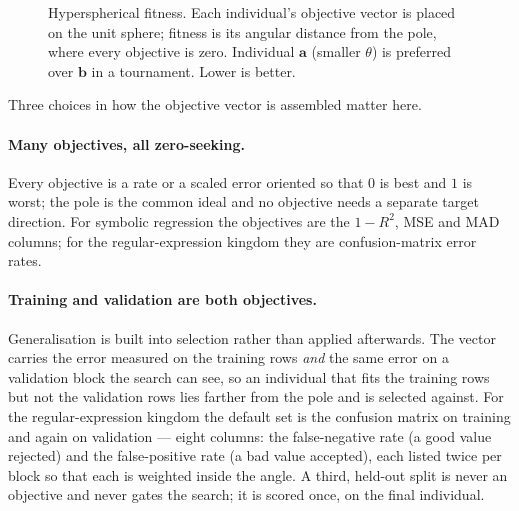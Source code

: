 \documentclass[sigconf,nonacm]{acmart}
\begin{document}
\begin{figure}[t]
\centering
{}
\caption{Hyperspherical fitness. Each individual's objective vector is placed on
the unit sphere; fitness is its angular distance from the pole, where every
objective is zero. Individual $\mathbf{a}$ (smaller $\theta$) is preferred over
$\mathbf{b}$ in a tournament. Lower is better.}
\label{fig:hff}
\end{figure}

Three choices in how the objective vector is assembled matter here.

\paragraph{Many objectives, all zero-seeking.} Every objective is a rate or a
scaled error oriented so that $0$ is best and $1$ is worst; the pole is the
common ideal and no objective needs a separate target direction. For symbolic
regression the objectives are the $1\!-\!R^2$, MSE and MAD columns; for the
regular-expression kingdom they are confusion-matrix error rates.

\paragraph{Training and validation are both objectives.} Generalisation is built
into selection rather than applied afterwards. The vector carries the error
measured on the training rows \emph{and} the same error on a validation block
the search can see, so an individual that fits the training rows but not the
validation rows lies farther from the pole and is selected against. For the
regular-expression kingdom the default set is the confusion matrix on training
and again on validation --- eight columns: the false-negative rate (a good value
rejected) and the false-positive rate (a bad value accepted), each listed twice
per block so that each is weighted inside the angle. A third, held-out split is
never an objective and never gates the search; it is scored once, on the final
individual.
\end{document}
